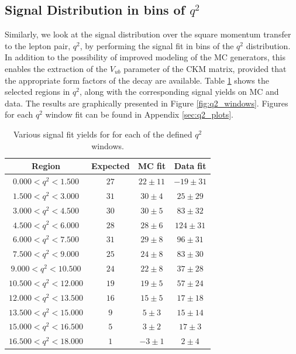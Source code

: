 \subsection{Signal Distribution in bins of \texorpdfstring{$q^2$}{q2}}
\label{sec:signal-distribution-in-bins-of-texorpdfstringq2q2}

Similarly, we look at the signal distribution over the square momentum transfer to the lepton pair, $q^2$, by performing the signal fit in bins of the $q^2$ distribution. In addition to the possibility of improved modeling of the MC generators, this enables the extraction of the $V_{ub}$ parameter of the CKM matrix, provided that the appropriate form factors of the decay are available. Table \ref{tab:q2_windows} shows the selected regions in $q^2$, along with the corresponding signal yields on MC and data. The results are graphically presented in Figure \ref{fig:q2_windows}. Figures for each $q^2$ window fit can be found in Appendix \ref{sec:q2_plots}.

\begin{table}[H]
	\centering
	\begin{tabular}{c|c|c|c}
		Region & Expected & MC fit & Data fit \\
		\toprule
		$0.000  < q^2 < 1.500$ & $27$ & $22 \pm 11$ & $-19 \pm 31$ \\
		$1.500  < q^2 < 3.000$ & $31$ & $30 \pm 4$ & $25 \pm 29$ \\
		$3.000  < q^2 < 4.500$ & $30$ & $30 \pm 5$ & $83 \pm 32$ \\
		$4.500  < q^2 < 6.000$ & $28$ & $28 \pm 6$ & $124 \pm 31$ \\
		$6.000  < q^2 < 7.500$ & $31$ & $29 \pm 8$ & $96 \pm 31$ \\
		$7.500  < q^2 < 9.000$ & $25$ & $24 \pm 8$ & $83 \pm 30$ \\
		$9.000  < q^2 < 10.500$ & $24$ & $22 \pm 8$ & $37 \pm 28$ \\
		$10.500  < q^2 < 12.000$ & $19$ & $19 \pm 5$ & $57 \pm 24$ \\
		$12.000  < q^2 < 13.500$ & $16$ & $15 \pm 5$ & $17 \pm 18$ \\
		$13.500  < q^2 < 15.000$ & $9$ & $5 \pm 3$ & $15 \pm 14$ \\
		$15.000  < q^2 < 16.500$ & $5$ & $3 \pm 2$ & $17 \pm 3$ \\
		$16.500  < q^2 < 18.000$ & $1$ & $-3 \pm 1$ & $2 \pm 4$ \\
		\bottomrule
	\end{tabular}
	\captionsetup{width=.8\linewidth}
	\caption{Various signal fit yields for for each of the defined $q^2$ windows.}
	\label{tab:q2_windows}
\end{table}

